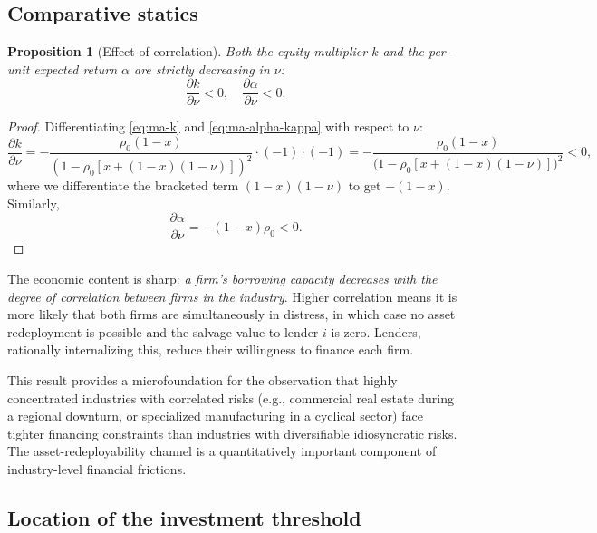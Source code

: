\documentclass[11pt,a4paper,oneside]{book}
\theoremstyle{plain}
\newtheorem{proposition}[theorem]{Proposition}
\theoremstyle{definition}
\theoremstyle{remark}
\numberwithin{equation}{chapter}
\begin{document}
\subsection{Comparative statics}

\begin{proposition}[Effect of correlation]\label{prop:ma-corr}
Both the equity multiplier $k$ and the per-unit expected return $\alpha$ are strictly decreasing in $\nu$:
\begin{equation*}
  \frac{\partial k}{\partial \nu} < 0,
  \quad
  \frac{\partial \alpha}{\partial \nu} < 0.
\end{equation*}
\end{proposition}

\begin{proof}
Differentiating \eqref{eq:ma-k} and \eqref{eq:ma-alpha-kappa} with respect to $\nu$:
\begin{equation*}
  \frac{\partial k}{\partial \nu} = -\frac{\rho_0 (1 - x)}{(1 - \rho_0 [x + (1 - x)(1 - \nu)])^2} \cdot (-1) \cdot (-1) = -\frac{\rho_0 (1 - x)}{\bigl(1 - \rho_0 [x + (1 - x)(1 - \nu)]\bigr)^2} < 0,
\end{equation*}
where we differentiate the bracketed term $(1-x)(1-\nu)$ to get $-(1-x)$.
Similarly,
\begin{equation*}
  \frac{\partial \alpha}{\partial \nu} = -(1 - x) \rho_0 < 0.
\end{equation*}
\end{proof}

The economic content is sharp: \emph{a firm's borrowing capacity decreases with the degree of correlation between firms in the industry}.
Higher correlation means it is more likely that both firms are simultaneously in distress, in which case no asset redeployment is possible and the salvage value to lender $i$ is zero.
Lenders, rationally internalizing this, reduce their willingness to finance each firm.

This result provides a microfoundation for the observation that highly concentrated industries with correlated risks (e.g., commercial real estate during a regional downturn, or specialized manufacturing in a cyclical sector) face tighter financing constraints than industries with diversifiable idiosyncratic risks.
The asset-redeployability channel is a quantitatively important component of industry-level financial frictions.

\subsection{Location of the investment threshold}
\end{document}
